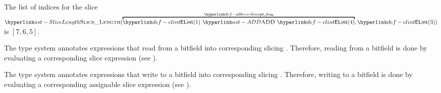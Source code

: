 

The list of indices for the slice \\
$\SliceLength(\AbbrevEBinop{\ADD}{\ELInt{1}}{\ELInt{4}}, \ELInt{3})$ is
$[7, 6, 5]$.



The type system annotates expressions that read from a bitfield into corresponding slicing \rhsexpressions{}.
Therefore, reading from a bitfield is done by evaluating a corresponding slice expression (see ).

The type system annotates expressions that write to a bitfield into corresponding slicing \assignableexpressions{}.
Therefore, writing to a bitfield is done by evaluating a corresponding assignable slice expression (see ).
